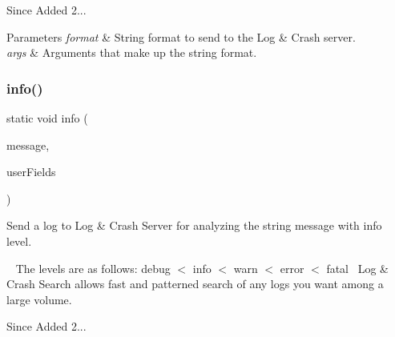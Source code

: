 \begin{DoxySince}{Since}
Added 2... 
\end{DoxySince}

\begin{DoxyParams}{Parameters}
{\em format} & String format to send to the Log \& Crash server. \\
\hline
{\em args} & Arguments that make up the string format. \\
\hline
\end{DoxyParams}
\mbox{\label{classcom_1_1toast_1_1android_1_1gamebase_1_1_gamebase_1_1_logger_af925caa862e19cfcbd7e14e628b389a4}} 
\subsubsection{\texorpdfstring{info()}{info()}\hspace{0.1cm}{\footnotesize\ttfamily [3/3]}}
{\footnotesize\ttfamily static void info (\begin{DoxyParamCaption}\item[{@Non\+Null final String}]{message,  }\item[{@Non\+Null final Map$<$ String, String $>$}]{user\+Fields }\end{DoxyParamCaption})\hspace{0.3cm}{\ttfamily [static]}}



Send a log to Log \& Crash Server for analyzing the string message with info level. 

~\newline
 The levels are as follows\+: debug $<$ info $<$ warn $<$ error $<$ fatal~\newline
 Log \& Crash Search allows fast and patterned search of any logs you want among a large volume.

\begin{DoxySince}{Since}
Added 2... 
\end{DoxySince}

